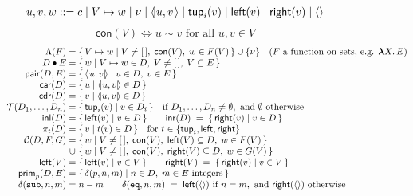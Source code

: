 \begin{figure}[t]
\small\figdefs
{}
\vspace{-10pt}
\[
\begin{array}{@{}r@{\;}c@{\;}l@{}}
  u, v, w & ::= & c \mid V \mapsto w \mid \nu \mid \pairv{u}{v}
    \mid \mathsf{tup}_i(v) \mid \mathsf{left}(v) \mid \mathsf{right}(v)
    \mid \langle\rangle
\end{array}
\]
\vspace{-10pt}
\[
  \mathsf{con}(V) \iff u \sim v \text{ for all } u, v \in V
\]
\[
\begin{array}{@{}r@{\;}c@{\;}l@{}}
  \Lambda(F) & = & \{\, V \mapsto w \mid V \neq [\,],\; \mathsf{con}(V),\; w \in F(V) \,\} \cup \{\nu\}
    \quad (F \text{ a function on sets, e.g. } \mlam{X} E)\\
  D \app E & = & \{\, w \mid V \mapsto w \in D,\; V \neq [\,],\; V \subseteq E \,\}\\
  \mathsf{pair}(D, E) & = & \{\, \pairv{u}{v} \mid u \in D,\; v \in E \,\}\\
  \car(D) & = & \{\, u \mid \pairv{u}{v} \in D \,\}\\
  \cdr(D) & = & \{\, v \mid \pairv{u}{v} \in D \,\}\\
  \mathcal{T}(D_1, \ldots, D_n) & = &
    \{\, \mathsf{tup}_i(v) \mid v \in D_i \,\}
    \quad \text{if } D_1, \ldots, D_n \neq \emptyset,
    \text{ and } \emptyset \text{ otherwise}\\
  \mathsf{inl}(D) & = & \{\, \mathsf{left}(v) \mid v \in D \,\}
    \qquad
  \mathsf{inr}(D) \;=\; \{\, \mathsf{right}(v) \mid v \in D \,\}\\
  \pi_t(D) & = & \{\, v \mid t(v) \in D \,\}
    \quad \text{for } t \in \{\mathsf{tup}_i, \mathsf{left}, \mathsf{right}\}\\
  \mathcal{C}(D, F, G) & = &
    \{\, w \mid V \neq [\,],\; \mathsf{con}(V),\; \mathsf{left}(V) \subseteq D,\; w \in F(V) \,\}\\
  & \cup & \{\, w \mid V \neq [\,],\; \mathsf{con}(V),\; \mathsf{right}(V) \subseteq D,\; w \in G(V) \,\}\\
  \mathsf{left}(V) & = & \{\, \mathsf{left}(v) \mid v \in V \,\}
    \qquad
  \mathsf{right}(V) \;=\; \{\, \mathsf{right}(v) \mid v \in V \,\}\\
  \mathsf{prim}_p(D, E) & = & \{\, \delta(p, n, m) \mid n \in D,\; m \in E \text{ integers} \,\}\\
  \delta(\kw{sub}, n, m) & = & n - m
    \qquad
  \delta(\kw{eq}, n, m) \;=\;
    \mathsf{left}(\langle\rangle) \text{ if } n = m,
    \text{ and } \mathsf{right}(\langle\rangle) \text{ otherwise}
\end{array}
\]


\end{figure}

